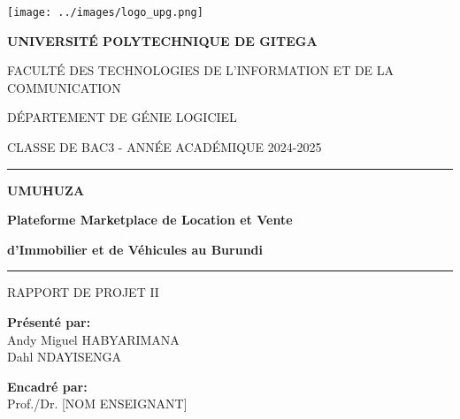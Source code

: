 \documentclass[12pt,a4paper]{report}
\begin{document}
\begin{titlepage}
    \begin{center}
        \vspace*{1cm}

        \texttt{[image: ../images/logo\_upg.png]} %

        \vspace{1cm}

        {\LARGE \textbf{UNIVERSITÉ POLYTECHNIQUE DE GITEGA}}

        \vspace{0.5cm}

        {\Large FACULTÉ DES TECHNOLOGIES DE L'INFORMATION ET DE LA COMMUNICATION}

        {\large DÉPARTEMENT DE GÉNIE LOGICIEL}

        {\large CLASSE DE BAC3 - ANNÉE ACADÉMIQUE 2024-2025}

        \vspace{2cm}

        \rule{\linewidth}{0.5mm}

        \vspace{0.5cm}

        {\Huge \textbf{UMUHUZA}}

        \vspace{0.3cm}

        {\LARGE \textbf{Plateforme Marketplace de Location et Vente}}

        {\LARGE \textbf{d'Immobilier et de Véhicules au Burundi}}

        \vspace{0.5cm}

        \rule{\linewidth}{0.5mm}

        \vspace{2cm}

        {\Large RAPPORT DE PROJET II}

        \vfill

        \begin{minipage}{0.4\textwidth}
            \begin{flushleft}
                \textbf{Présenté par:}\\
                Andy Miguel HABYARIMANA\\
                Dahl NDAYISENGA
            \end{flushleft}
        \end{minipage}
        \hfill
        \begin{minipage}{0.4\textwidth}
            \begin{flushright}
                \textbf{Encadré par:}\\
                Prof./Dr. [NOM ENSEIGNANT]
            \end{flushright}
        \end{minipage}


\end{center}
\end{titlepage}
\end{document}
